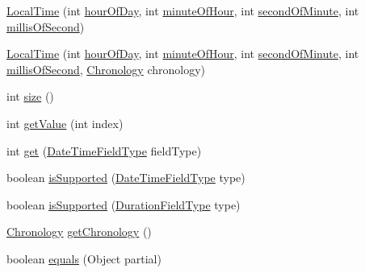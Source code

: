 \begin{DoxyCompactItemize}
\item 
\hyperlink{classorg_1_1joda_1_1time_1_1_local_time_af68f7c1375e43a7f68341cc14eb96123}{Local\-Time} (int \hyperlink{classorg_1_1joda_1_1time_1_1_local_time_a61533ce76db2296ae3217e1accb06397}{hour\-Of\-Day}, int \hyperlink{classorg_1_1joda_1_1time_1_1_local_time_a63d30bc94f90913864d8a0b1481d65a7}{minute\-Of\-Hour}, int \hyperlink{classorg_1_1joda_1_1time_1_1_local_time_a6b79349556e7a87b3ca25576aab58f42}{second\-Of\-Minute}, int \hyperlink{classorg_1_1joda_1_1time_1_1_local_time_a97da4c8bd786b720a66073104d14638f}{millis\-Of\-Second})
\item 
\hyperlink{classorg_1_1joda_1_1time_1_1_local_time_ad5defe1085fae5f1db83f044ee81bcd1}{Local\-Time} (int \hyperlink{classorg_1_1joda_1_1time_1_1_local_time_a61533ce76db2296ae3217e1accb06397}{hour\-Of\-Day}, int \hyperlink{classorg_1_1joda_1_1time_1_1_local_time_a63d30bc94f90913864d8a0b1481d65a7}{minute\-Of\-Hour}, int \hyperlink{classorg_1_1joda_1_1time_1_1_local_time_a6b79349556e7a87b3ca25576aab58f42}{second\-Of\-Minute}, int \hyperlink{classorg_1_1joda_1_1time_1_1_local_time_a97da4c8bd786b720a66073104d14638f}{millis\-Of\-Second}, \hyperlink{classorg_1_1joda_1_1time_1_1_chronology}{Chronology} chronology)
\item 
int \hyperlink{classorg_1_1joda_1_1time_1_1_local_time_a7f7fec9e367c90efc4457375b7664c17}{size} ()
\item 
int \hyperlink{classorg_1_1joda_1_1time_1_1_local_time_aa45a30e0e87f8cf7893833c13a1e55b0}{get\-Value} (int index)
\item 
int \hyperlink{classorg_1_1joda_1_1time_1_1_local_time_a86ca0f93d2efe606a3264870d0b70c66}{get} (\hyperlink{classorg_1_1joda_1_1time_1_1_date_time_field_type}{Date\-Time\-Field\-Type} field\-Type)
\item 
boolean \hyperlink{classorg_1_1joda_1_1time_1_1_local_time_ab9d82a5b0b15c394a21fe221535dc880}{is\-Supported} (\hyperlink{classorg_1_1joda_1_1time_1_1_date_time_field_type}{Date\-Time\-Field\-Type} type)
\item 
boolean \hyperlink{classorg_1_1joda_1_1time_1_1_local_time_a32d0a0038cd096502de1df8de0256535}{is\-Supported} (\hyperlink{classorg_1_1joda_1_1time_1_1_duration_field_type}{Duration\-Field\-Type} type)
\item 
\hyperlink{classorg_1_1joda_1_1time_1_1_chronology}{Chronology} \hyperlink{classorg_1_1joda_1_1time_1_1_local_time_ae2a4503fb7a70ff0a2090cf79519133d}{get\-Chronology} ()
\item 
boolean \hyperlink{classorg_1_1joda_1_1time_1_1_local_time_abba51b841c759cc108d76c2fddd9dbc1}{equals} (Object partial)

\end{DoxyCompactItemize}
